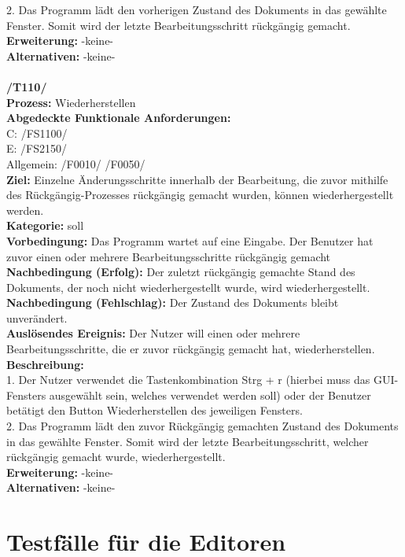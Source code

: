 \documentclass[a4paper]{scrreprt}
\begin{document}
2. Das Programm lädt den vorherigen Zustand des Dokuments in das gewählte Fenster. Somit wird der letzte Bearbeitungsschritt rückgängig gemacht. \\
\textbf {Erweiterung:} -keine- \\
\textbf {Alternativen:} -keine- \\\\
\textbf{/T110/} \\ 
\textbf{Prozess: }Wiederherstellen \\
\textbf{Abgedeckte Funktionale Anforderungen:}\\
C: /FS1100/ \\
E: /FS2150/ \\
Allgemein: /F0010/ /F0050/ \\
\textbf{Ziel:} Einzelne Änderungsschritte innerhalb der Bearbeitung, die zuvor mithilfe des Rückgängig-Prozesses rückgängig gemacht wurden, können wiederhergestellt werden.\\
\textbf{Kategorie:} soll\\
\textbf{Vorbedingung:} Das Programm wartet auf eine Eingabe. Der Benutzer hat zuvor einen oder mehrere Bearbeitungsschritte rückgängig gemacht\\
\textbf{Nachbedingung (Erfolg):} Der zuletzt rückgängig gemachte Stand des Dokuments, der noch nicht wiederhergestellt wurde, wird wiederhergestellt.
\textbf{Nachbedingung (Fehlschlag):} Der Zustand des Dokuments bleibt unverändert.\\
\textbf{Auslösendes Ereignis:} Der Nutzer will einen oder mehrere Bearbeitungsschritte, die er zuvor rückgängig gemacht hat, wiederherstellen.\\
\textbf{Beschreibung:} \\
1. Der Nutzer verwendet die Tastenkombination Strg + r (hierbei muss das GUI-Fensters ausgewählt sein, welches verwendet werden soll) oder der Benutzer betätigt den Button Wiederherstellen des jeweiligen Fensters.\\
2. Das Programm lädt den zuvor Rückgängig gemachten Zustand des Dokuments in das gewählte Fenster. Somit wird der letzte Bearbeitungsschritt, welcher rückgängig gemacht wurde, wiederhergestellt. \\
\textbf {Erweiterung:} -keine- \\
\textbf {Alternativen:} -keine- \\

\section{Testfälle für die Editoren}
\end{document}
